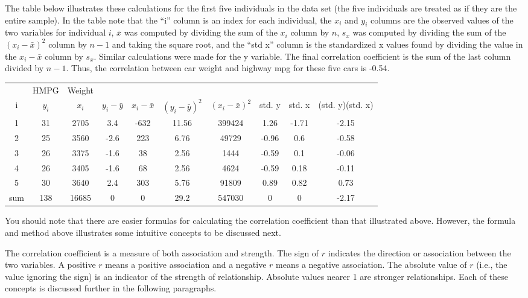 \documentclass[10pt,openany]{book}\usepackage[]{graphicx}\usepackage[]{color}
\begin{document}

The table below illustrates these calculations for the first five individuals in the  data set (the five individuals are treated as if they are the entire sample).  In the table note that the ``i'' column is an index for each individual, the $x_{i}$ and $y_{i}$ columns are the observed values of the two variables for individual $i$, $\bar{x}$ was computed by dividing the sum of the $x_{i}$ column by $n$, $s_{x}$ was computed by dividing the sum of the $(x_{i}-\bar{x})^{2}$ column by $n-1$ and taking the square root, and the ``std x'' column is the standardized x values found by dividing the value in the $x_{i}-\bar{x}$ column by $s_{x}$.  Similar calculations were made for the y variable.  The final correlation coefficient is the sum of the last column divided by $n-1$.  Thus, the correlation between car weight and highway mpg for these five cars is -0.54.

\begin{center}
  \begin{tabular}{cccccccccc}
\hline\hline
 & HMPG & Weight & & & & & & & \\
i & $y_{i}$ & $x_{i}$ & $y_{i}-\bar{y}$ & $x_{i}-\bar{x}$ & $(y_{i}-\bar{y})^{2}$ & $(x_{i}-\bar{x})^{2}$ & std. y & std. x & (std. y)(std. x) \\
\hline
1 & 31 & 2705 &  3.4 & -632 & 11.56 & 399424 &  1.26 & -1.71 & -2.15 \\
2 & 25 & 3560 & -2.6 &  223 &  6.76 &  49729 & -0.96 &  0.6  & -0.58 \\
3 & 26 & 3375 & -1.6 &   38 &  2.56 &   1444 & -0.59 &  0.1  & -0.06 \\
4 & 26 & 3405 & -1.6 &   68 &  2.56 &   4624 & -0.59 &  0.18 & -0.11 \\
5 & 30 & 3640 &  2.4 &  303 &  5.76 &  91809 &  0.89 &  0.82 &  0.73 \\
\hline
sum & 138 & 16685 & 0 & 0 & 29.2 & 547030 & 0 & 0 &  -2.17 \\
\hline\hline
  \end{tabular}
\end{center}

You should note that there are easier formulas for calculating the correlation coefficient than that illustrated above.  However, the formula and method above illustrates some intuitive concepts to be discussed next.

The correlation coefficient is a measure of both association and strength.  The sign of $r$ indicates the direction or association between the two variables.  A positive $r$ means a positive association and a negative $r$ means a negative association.  The absolute value of $r$ (i.e., the value ignoring the sign) is an indicator of the strength of relationship.  Absolute values nearer 1 are stronger relationships.  Each of these concepts is discussed further in the following paragraphs.
\end{document}
